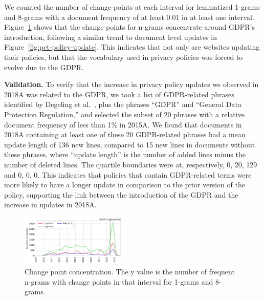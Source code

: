 We counted the number of change-points at each interval for lemmatized 1-grams and 8-grams with a document frequency of at least $0.01$ in at least one interval.
Figure~\ref{fig:changepoints} shows that the change points for n-grams concentrate around GDPR's introduction, following a similar trend to document level updates in Figure~\ref{fig:pct-policy-update}. This indicates that not only are websites updating their policies, but that the vocabulary used in privacy policies was forced to evolve due to the GDPR.


\textbf{Validation.} To verify that the increase in privacy policy updates we observed in 2018A was related to the GDPR, we took a list of GDPR-related phrases identified by Degeling et al.~\cite{degeling2018we}, plus the phrases “GDPR” and “General Data Protection Regulation,” and selected the subset of 20 phrases with a relative document frequency of less than 1\% in 2015A. We found that documents in 2018A containing at least one of these 20 GDPR-related phrases had a mean update length of 136 new lines, compared to 15 new lines in documents without these phrases, where “update length” is the number of added lines minus the number of deleted lines. The quartile boundaries were at, respectively, 0, 20, 129 and 0, 0, 0. This indicates that policies that contain GDPR-related terms were more likely to have a longer update in comparison to the prior version of the policy, supporting the link between the introduction of the GDPR and the increase in updates in 2018A.

\begin{figure}
    \centering
    \includegraphics[width=0.45\textwidth]{figures/changepoints.pdf}
    \caption{Change point concentration. The y value is the number of frequent n-grams with change points in that interval for 1-grams and 8-grams.}
    \label{fig:changepoints}
\end{figure}
